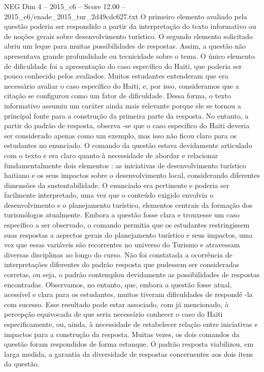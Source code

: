 \begin{textsample}{NEG Dim 4 – 2015\_c6 – Score 12.00 – 2015\_c6/enade\_2015\_tur\_2d49cdc627.txt}
O primeiro elemento avaliado pela questão poderia ser respondido a partir da interpretação do texto informativo ou de noções gerais sobre desenvolvimento turístico.
O segundo elemento solicitado abriu um leque para muitas possibilidades de respostas.
Assim, a questão não apresentava grande profundidade ou tecnicidade sobre o tema.
O único elemento de dificuldade foi a apresentação do caso específico do Haiti, que poderia ser pouco conhecido pelos avaliados.
Muitos estudantes entenderam que era necessário avaliar o caso específico do Haiti, e, por isso, consideramos que a citação se configurou como um fator de dificuldade.
Dessa forma, o texto informativo assumiu um caráter ainda mais relevante porque ele se tornou a principal fonte para a construção da primeira parte da resposta.
No entanto, a partir do padrão de resposta, observa -se que o caso específico do Haiti deveria ser considerado apenas como um exemplo, mas isso não ficou claro para os estudantes no enunciado.
O comando da questão estava devidamente articulado com o texto e era claro quanto à necessidade de abordar e relacionar fundamentalmente dois elementos : as iniciativas de desenvolvimento turístico haitiano e os seus impactos sobre o desenvolvimento local, considerando diferentes dimensões da sustentabilidade.
O enunciado era pertinente e poderia ser facilmente interpretado, uma vez que o conteúdo exigido envolvia o desenvolvimento e o planejamento turístico, elementos centrais da formação dos turismólogos atualmente.
Embora a questão fosse clara e trouxesse um caso específico a ser observado, o comando permitia que os estudantes restringissem suas respostas a aspectos gerais do planejamento turístico e seus impactos, uma vez que essas variáveis são recorrentes no universo do Turismo e atravessam diversas disciplinas ao longo do curso.
Não foi constatada a ocorrência de interpretações diferentes do padrão resposta que pudessem ser consideradas corretas, ou seja, o padrão contemplou devidamente as possibilidades de respostas encontradas.
Observamos, no entanto, que, embora a questão fosse atual, acessível e clara para os estudantes, muitos tiveram dificuldades de respondê -la com sucesso.
Esse resultado pode estar associado, com já mencionado, à percepção equivocada de que seria necessário conhecer o caso do Haiti especificamente, ou, ainda, à necessidade de estabelecer relação entre iniciativas e impactos para a construção da resposta.
Muitas vezes, os dois comandos da questão foram respondidos de forma estanque.
O padrão resposta viabilizou, em larga medida, a garantia da diversidade de respostas concernentes aos dois itens da questão.

\end{textsample}
